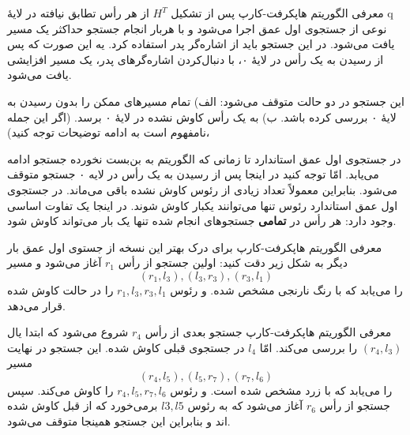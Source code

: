 \begin{itemframe}{‌معرفی الگوریتم هاپکرفت-کارپ}
\decLineSpace[1mm]
\itm
پس از تشکیل  $H^T$ از هر رأس تطابق نیافته در لایهٔ q نوعی از جستجوی اول عمق اجرا می‌شود و با هربار انجام جستجو حداکثر یک مسیر یافت می‌شود.
\itm
در این جستجو باید از اشاره‌گر پدر استفاده کرد. یه این صورت که پس از رسیدن به یک رأس در لایهٔ ۰، با دنبال‌کردن ‌اشاره‌گرهای پدر، یک مسیر افزایشی یافت می‌شود.

\itm
این جستجو در دو حالت متوقف می‌شود:
الف) تمام مسیرهای ممکن را بدون رسیدن به لایهٔ ۰ بررسی کرده باشد.
ب) به یک رأس کاوش نشده در لایهٔ ۰ برسد. (اگر این جمله نامفهوم است به ادامه توضیحات توجه کنید)،

\itm
در جستجوی اول عمق استاندارد تا زمانی که الگوریتم به بن‌بست نخورده جستجو ادامه می‌یابد. امّا توجه کنید در اینجا پس از رسیدن به یک رأس در لایه ۰ جستجو متوقف می‌شود. بنابراین معمولاً تعداد زیادی از رئوس کاوش نشده باقی می‌ماند.
\itm
در جستجوی اول عمق استاندارد رئوس تنها می‌توانند یکبار کاوش شوند. در اینجا یک تفاوت اساسی وجود دارد: هر رأس در \textbf{تمامی} جستجوهای انجام شده تنها یک بار می‌تواند کاوش شود.
\end{itemframe}


\begin{itemframe}{‌معرفی الگوریتم هاپکرفت-کارپ}
\itm
برای درک بهتر این نسخه از جستوی اول عمق بار دیگر به شکل زیر دقت کنید:
\itm
اولین جستجو از رأس
$r_1$
آغاز می‌شود و مسیر
$$ (r_1, l_3), (l_3, r_3), (r_3, l_1) $$
را می‌یابد که با رنگ نارنجی مشخص شده. و رئوس
$r_1, l_3, r_3, l_1$
را در حالت کاوش شده قرار می‌دهد.
\end{itemframe}


\begin{itemframe}{‌معرفی الگوریتم هاپکرفت-کارپ}
\itm
 جستجو بعدی از رأس
$r_4$
شروع می‌شود که ابتدا یال
$(r_4, l_3)$
را بررسی می‌کند. امّا
$l_4$
در جستجوی قبلی کاوش شده. این جستجو در نهایت مسیر
$$(r_4, l_5), (l_5, r_7), (r_7, l_6)$$
را می‌یابد که با زرد مشخص شده است. و رئوس
$r_4, l_5, r_7, l_6$
را کاوش می‌کند.
\itm
سپس جستجو از رأس
$r_6$
آغاز می‌شود که به رئوس
$l3, l5$
برمی‌خورد که از قبل کاوش شده اند و بنابراین این جستجو همینجا متوقف می‌شود.
\end{itemframe}


